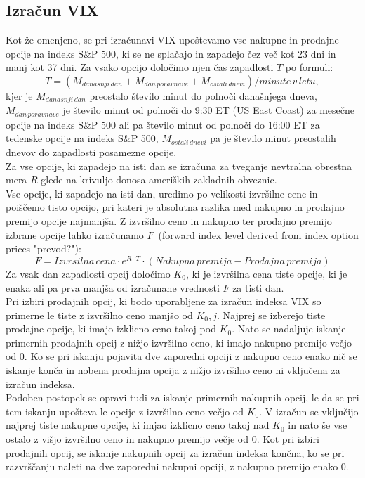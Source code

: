 \documentclass[12pt,a4paper]{amsart}
\theoremstyle{definition} %
\theoremstyle{plain} %
\begin{document}
\subsection{Izračun VIX}
Kot že omenjeno, se pri izračunavi VIX upoštevamo vse nakupne in prodajne opcije na indeks S\&P 500, ki se ne splačajo in zapadejo čez več kot 23 dni in manj kot 37 dni.
Za vsako opcijo določimo njen čas zapadlosti $T$ po formuli:
$$
T = (M_{danasnji\, dan} + M_{dan \,poravnave} + M_{ostali\, dnevi}) / minute\, v\, letu,
$$
kjer je $M_{danasnji\, dan}$ preostalo število minut do polnoči današnjega dneva, $M_{dan \,poravnave}$ je število minut od polnoči do 9:30 ET (US East Coast) za mesečne opcije na indeks S\&P 500 ali pa število minut od polnoči do 16:00 ET za tedenske opcije na indeks S\&P 500, $ M_{ostali\, dnevi}$ pa je število minut preostalih dnevov do zapadlosti posamezne opcije.\\

Za vse opcije, ki zapadejo na isti dan se izračuna za tveganje nevtralna obrestna mera $R$ glede na krivuljo donosa ameriških zakladnih obveznic.\\

Vse opcije, ki zapadejo na isti dan, uredimo po velikosti izvršilne cene in poiščemo tisto opcijo, pri kateri je absolutna razlika med nakupno in prodajno premijo opcije najmanjša. Z izvršilno ceno in nakupno ter prodajno premijo izbrane opcije lahko izračunamo $F$~(forward index level derived from index option prices "prevod?"):
$$
F= Izvrsilna\,cena \cdot e^{R\cdot T} \cdot (Nakupna\, premija - Prodajna\, premija)
$$
Za vsak dan zapadlosti opcij določimo $K_0$, ki je izvršilna cena tiste opcije, ki je enaka ali pa prva manjša od izračunane vrednosti $F$ za tisti dan.\\

Pri izbiri prodajnih opcij, ki bodo uporabljene za izračun indeksa VIX so primerne le tiste z izvršilno ceno manjšo od $K_0,j$. Najprej se izberejo tiste prodajne opcije, ki imajo izklicno ceno takoj pod $K_0$. Nato se nadaljuje iskanje primernih prodajnih opcij z nižjo izvršilno ceno, ki imajo nakupno premijo večjo od 0. Ko se pri iskanju pojavita dve zaporedni opciji z nakupno ceno enako nič se iskanje konča in nobena prodajna opcija z nižjo izvršilno ceno ni vključena za izračun indeksa.\\

Podoben postopek se opravi tudi za iskanje primernih nakupnih opcij, le da se pri tem iskanju upošteva le opcije z izvršilno ceno večjo od $K_0$. V izračun se vključijo najprej tiste nakupne opcije, ki imjao izklicno ceno takoj nad $K_0$ in nato še vse ostalo z višjo izvršilno ceno in nakupno premijo večje od 0. Kot pri izbiri prodajnih opcij, se iskanje nakupnih opcij za izračun indeksa končna, ko se pri razvrščanju naleti na dve zaporedni nakupni opciji, z nakupno premijo enako 0.\\
\end{document}
